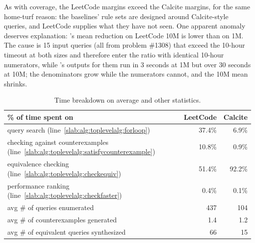 As with coverage, the LeetCode margins exceed the Calcite margins, for
the same home-turf reason: the baselines' rule sets are designed
around Calcite-style queries, and LeetCode supplies what they have not
seen. One apparent anomaly deserves explanation: \toolname's mean
reduction on LeetCode 10M is lower than on 1M. The cause is 15 input
queries (all from problem \#1308) that exceed the 10-hour timeout at
both sizes and therefore enter the ratio with identical 10-hour
numerators, while \toolname's outputs for them run in 3 seconds at 1M
but over 30 seconds at 10M; the denominators grow while the numerators
cannot, and the 10M mean shrinks.

\begin{table}[!t]
\footnotesize
\caption{\small Time breakdown on average and other statistics.}
\vspace{-8pt}
\centering
\setlength{\tabcolsep}{3pt}
\def\arraystretch{1.5}
\begin{tabular}{  R{180pt} | r  r   }
\toprule
\% of time spent on 
& LeetCode
& Calcite
\\ \midrule
{query search (line~\ref{slab:alg:toplevelalg:forloop})} 
& {37.4\%}
& {6.9\%} 
\\ 
{checking against counterexamples (line~\ref{slab:alg:toplevelalg:satisfycounterexample}}) 
& {10.8\%}
& {0.9\%}
\\ 
{equivalence  checking (line~\ref{slab:alg:toplevelalg:checkequiv}})
& {51.4\%}
& {92.2\%}  
\\ 
{performance ranking (line~\ref{slab:alg:toplevelalg:checkfaster})} 
& {0.4\%} 
& {0.1\%} 
\\ \midrule \midrule 
{avg \# of queries enumerated}
& {437} 
& {104}
\\ 
{avg \# of counterexamples generated}
& {1.4}
& {1.2}
\\ 
{avg \# of equivalent queries synthesized}
& {66}
& {15} 
\\ \bottomrule
\end{tabular}

\vspace{-12pt}
\label{slab:tab:time-breakdown}
\end{table}





